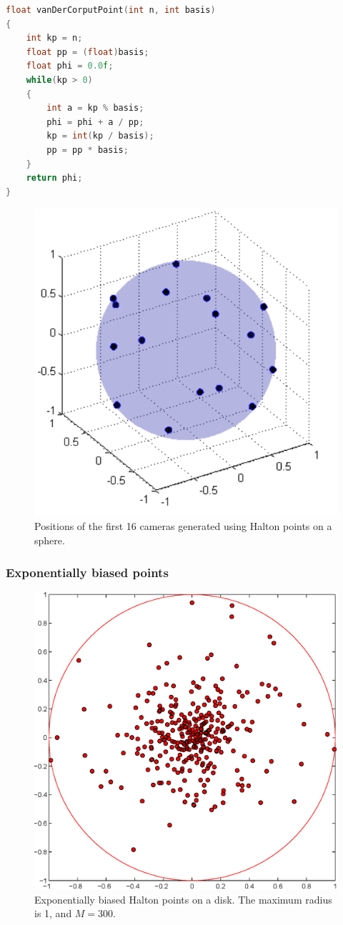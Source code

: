 \begin{lstlisting}[language=C++,label=lst:vandercorput,caption={Generating the p-adic Van der Corput point.}]
float vanDerCorputPoint(int n, int basis)
{
    int kp = n;
    float pp = (float)basis;
    float phi = 0.0f;
    while(kp > 0)
    {
        int a = kp % basis;
        phi = phi + a / pp;
        kp = int(kp / basis);
        pp = pp * basis;
    }
    return phi;
}
\end{lstlisting}
\begin{figure}[!ht]
\centering
\includegraphics[width=0.5\linewidth]{images/matlab/cameras.pdf}
\caption{Positions of the first 16 cameras generated using Halton points on a sphere.}
\label{fig:cameras}
\end{figure} 

\subsubsection{Exponentially biased points}
\label{sec:exponentiallybiased}

\begin{figure}[!ht]
\centering
\includegraphics[width=0.7\linewidth]{images/matlab/halton_exp.eps}
\caption{Exponentially biased Halton points on a disk. The maximum radius is 1, and $M = 300$.}
\label{fig:hp}
\end{figure} 

